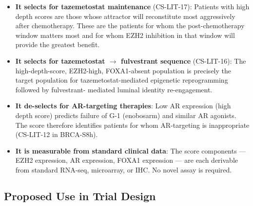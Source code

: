 \documentclass[12pt, a4paper]{article}
\begin{document}
\begin{itemize}
    \item \textbf{It selects for tazemetostat
    maintenance} (CS-LIT-17): Patients with
    high depth scores are those whose attractor
    will reconstitute most aggressively after
    chemotherapy. These are the patients for
    whom the post-chemotherapy window matters
    most and for whom EZH2 inhibition in that
    window will provide the greatest benefit.

    \item \textbf{It selects for tazemetostat
    $\rightarrow$ fulvestrant sequence}
    (CS-LIT-16): The high-depth-score,
    EZH2-high, FOXA1-absent population is
    precisely the target population for
    tazemetostat-mediated epigenetic
    reprogramming followed by fulvestrant-
    mediated luminal identity re-engagement.

    \item \textbf{It de-selects for AR-targeting
    therapies}: Low AR expression (high depth
    score) predicts failure of G-1 (enobosarm)
    and similar AR agonists. The score therefore
    identifies patients for whom AR-targeting
    is inappropriate (CS-LIT-12 in BRCA-S8h).

    \item \textbf{It is measurable from standard
    clinical data}: The score components ---
    EZH2 expression, AR expression, FOXA1
    expression --- are each derivable from
    standard RNA-seq, microarray, or IHC.
    No novel assay is required.
\end{itemize}

\subsection{Proposed Use in Trial Design}
\end{document}
